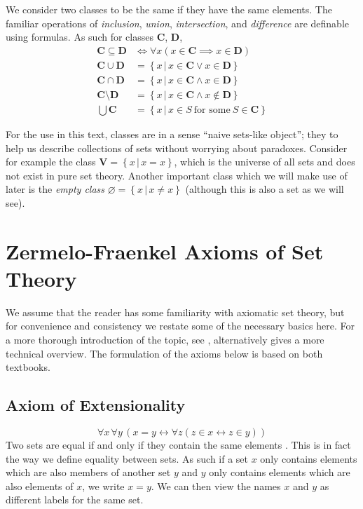\documentclass[../../main.tex]{subfiles}
\begin{document}
We consider two classes to be the same if they have the same elements.
The familiar operations of \textit{inclusion}, \textit{union}, \textit{intersection}, and \textit{difference} are definable using formulas.
As such for classes $\mathbf{C}$, $\mathbf{D}$,
\begin{align*}
    \mathbf{C} \subseteq \mathbf{D} &\iff \forall x \left(x \in \mathbf{C} \implies x \in \mathbf{D}\right) \\
    \mathbf{C} \cup \mathbf{D} &= \left\{x \,\vert\, x \in \mathbf{C} \vee x \in \mathbf{D}\right\} \\
    \mathbf{C} \cap \mathbf{D} &= \left\{x \,\vert\, x \in \mathbf{C} \wedge x \in \mathbf{D}\right\} \\ 
    \mathbf{C} \setminus \mathbf{D} &= \left\{x \,\vert\, x \in \mathbf{C} \wedge x \not\in \mathbf{D}\right\} \\
    \bigcup \mathbf{C} &= \left\{x \,\vert\, x \in S \ \text{for some}\ S \in \mathbf{C}\right\}
\end{align*}\cite[pp.3-4]{Jec78}

For the use in this text, classes are in a sense ``naive sets-like object''; they to help us describe collections of sets without worrying about paradoxes.
Consider for example the class $\mathbf{V} = \left\{x \,\vert\, x=x\right\}$, which is the universe of all sets and does not exist in pure set theory.
Another important class which we will make use of later is the \textit{empty class} $\varnothing = \left\{x \,\vert\, x \neq x\right\}$ (although this is also a set as we will see).

\section{Zermelo-Fraenkel Axioms of Set Theory}
We assume that the reader has some familiarity with axiomatic set theory, but for convenience and consistency we restate some of the necessary basics here. %
For a more thorough introduction of the topic, see \cite[\S\S 4.3-4.5]{Gol17}, alternatively \cite[\S 1.1]{Jec78} gives a more technical overview.
The formulation of the axioms below is based on both textbooks.

\subsection{Axiom of Extensionality}\label{ZF1}
$$\forall x\, \forall y\, \left(x = y \leftrightarrow \forall z \left(z \in x \leftrightarrow z \in y\right) \right)$$
Two sets are equal if and only if they contain the same elements \cite[\S 4.3, p.76]{Gol17}.
This is in fact the way we define equality between sets.
As such if a set $x$ only contains elements which are also members of another set $y$ and $y$ only contains elements which are also elements of $x$, we write $x = y$.
We can then view the names $x$ and $y$ as different labels for the same set.
\end{document}
